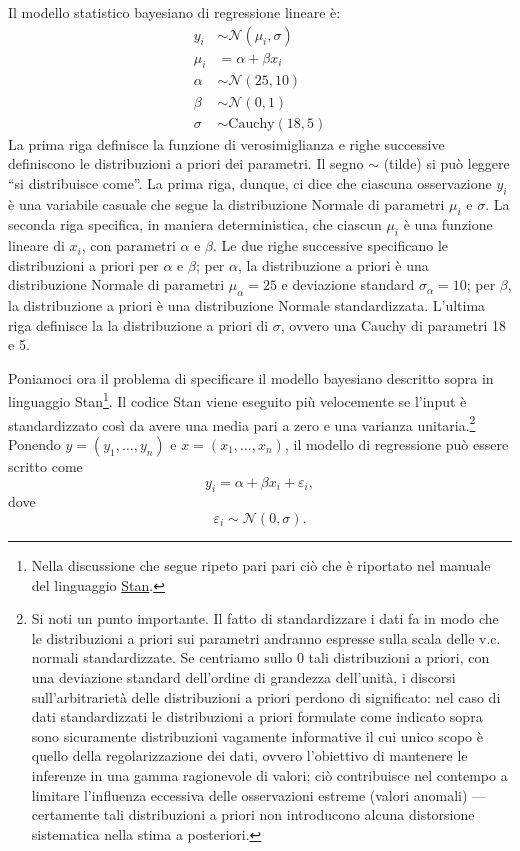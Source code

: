 \documentclass[
  10pt,
  italian,
  a4paper,
  extrafontsizes,onecolumn,openright
  ]{memoir}
\begin{document}
Il modello statistico bayesiano di regressione lineare è:
\[
\begin{aligned}
y_i &\sim \mathcal{N}(\mu_i, \sigma) \\
\mu_i &= \alpha + \beta x_i \\
\alpha &\sim \mathcal{N}(25, 10) \\
\beta &\sim \mathcal{N}(0, 1) \\
\sigma &\sim \text{Cauchy}(18, 5) 
\end{aligned}
\]
La prima riga definisce la funzione di verosimiglianza e righe successive definiscono le distribuzioni a priori dei parametri. Il segno \(\sim\) (tilde) si può leggere ``si distribuisce come''. La prima riga, dunque, ci dice che ciascuna osservazione \(y_i\) è una variabile casuale che segue la distribuzione Normale di parametri \(\mu_i\) e \(\sigma\). La seconda riga specifica, in maniera deterministica, che ciascun \(\mu_i\) è una funzione lineare di \(x_i\), con parametri \(\alpha\) e \(\beta\). Le due righe successive specificano le distribuzioni a priori per \(\alpha\) e \(\beta\); per \(\alpha\), la distribuzione a priori è una distribuzione Normale di parametri \(\mu_{\alpha} = 25\) e deviazione standard \(\sigma_{\alpha} = 10\); per \(\beta\), la distribuzione a priori è una distribuzione Normale standardizzata. L'ultima riga definisce la la distribuzione a priori di \(\sigma\), ovvero una Cauchy di parametri 18 e 5.

Poniamoci ora il problema di specificare il modello bayesiano descritto sopra in linguaggio Stan\footnote{Nella discussione che segue ripeto pari pari ciò che è riportato nel manuale del linguaggio \href{https://mc-stan.org/docs/2_27/stan-users-guide/standardizing-predictors-and-outputs.html}{Stan}.}. Il codice Stan viene eseguito più velocemente se l'input è standardizzato così da avere una media pari a zero e una varianza unitaria.\footnote{Si noti un punto importante. Il fatto di standardizzare i dati fa in modo che le distribuzioni a priori sui parametri andranno espresse sulla scala delle v.c. normali standardizzate. Se centriamo sullo 0 tali distribuzioni a priori, con una deviazione standard dell'ordine di grandezza dell'unità, i discorsi sull'arbitrarietà delle distribuzioni a priori perdono di significato: nel caso di dati standardizzati le distribuzioni a priori formulate come indicato sopra sono sicuramente distribuzioni vagamente informative il cui unico scopo è quello della regolarizzazione dei dati, ovvero l'obiettivo di mantenere le inferenze in una gamma ragionevole di valori; ciò contribuisce nel contempo a limitare l'influenza eccessiva delle osservazioni estreme (valori anomali) --- certamente tali distribuzioni a priori non introducono alcuna distorsione sistematica nella stima a posteriori.}
Ponendo \(y = (y_1, \dots, y_n)\) e \(x = (x_1, \dots, x_n)\), il modello di regressione può essere scritto come
\[
y_i = \alpha + \beta x_i + \varepsilon_i,
\]
\noindent
dove
\[
\varepsilon_i \sim \mathcal{N}(0, \sigma).
\]
\end{document}
